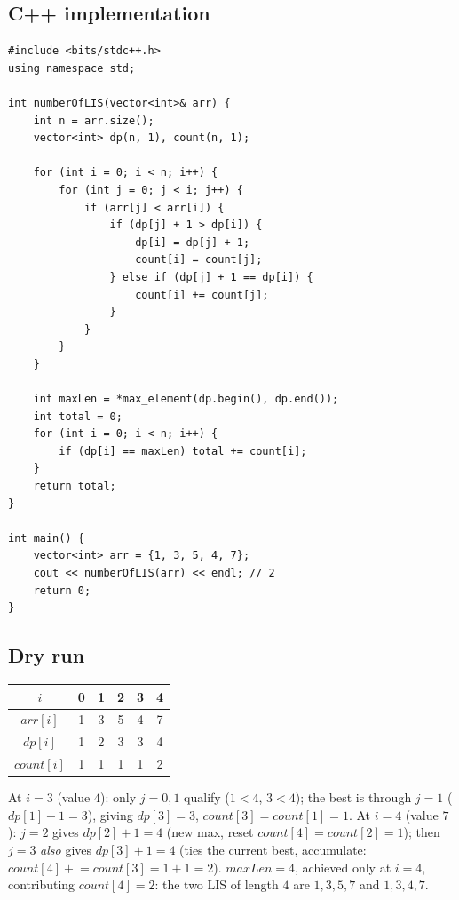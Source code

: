 \subsection*{C++ implementation}

\begin{lstlisting}
#include <bits/stdc++.h>
using namespace std;

int numberOfLIS(vector<int>& arr) {
    int n = arr.size();
    vector<int> dp(n, 1), count(n, 1);

    for (int i = 0; i < n; i++) {
        for (int j = 0; j < i; j++) {
            if (arr[j] < arr[i]) {
                if (dp[j] + 1 > dp[i]) {
                    dp[i] = dp[j] + 1;
                    count[i] = count[j];
                } else if (dp[j] + 1 == dp[i]) {
                    count[i] += count[j];
                }
            }
        }
    }

    int maxLen = *max_element(dp.begin(), dp.end());
    int total = 0;
    for (int i = 0; i < n; i++) {
        if (dp[i] == maxLen) total += count[i];
    }
    return total;
}

int main() {
    vector<int> arr = {1, 3, 5, 4, 7};
    cout << numberOfLIS(arr) << endl; // 2
    return 0;
}
\end{lstlisting}

\subsection*{Dry run}


\begin{center}
\begin{tabular}{c|c|c|c|c|c}
$i$ & 0 & 1 & 2 & 3 & 4 \\ \hline
$\textit{arr}[i]$ & 1 & 3 & 5 & 4 & 7 \\ \hline
$\textit{dp}[i]$ & 1 & 2 & 3 & 3 & 4 \\ \hline
$\textit{count}[i]$ & 1 & 1 & 1 & 1 & 2
\end{tabular}
\end{center}

At $i=3$ (value $4$): only $j=0,1$ qualify ($1<4$, $3<4$); the best is
through $j=1$ ($\textit{dp}[1]+1=3$), giving $\textit{dp}[3]=3$,
$\textit{count}[3]=\textit{count}[1]=1$. At $i=4$ (value $7$):
$j=2$ gives $\textit{dp}[2]+1=4$ (new max, reset
$\textit{count}[4]=\textit{count}[2]=1$); then $j=3$ \emph{also} gives
$\textit{dp}[3]+1=4$ (ties the current best, accumulate:
$\textit{count}[4] \mathrel{+}= \textit{count}[3] = 1+1=2$).
$\textit{maxLen}=4$, achieved only at $i=4$, contributing
$\textit{count}[4]=2$: the two LIS of length $4$ are $1,3,5,7$ and
$1,3,4,7$.

